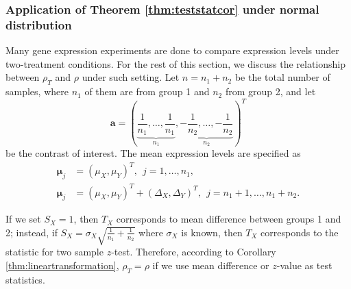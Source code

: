 	\subsubsection{Application of Theorem \ref{thm:teststatcor} under normal distribution}
	
	Many gene expression experiments are done to compare expression levels under two-treatment 
	conditions. For the rest of this section, we discuss the relationship between $\rho_T$ and 
	$\rho$ under such setting.
	Let $n = n_1 + n_2$ be the total number of samples, where $n_1$ of them are from group 1 and 
	$n_2$ from group 2, and let
	\begin{equation}\label{eq:contrast}
	\bm a  = (\underbrace{\frac{1}{n_1}, \ldots, \frac{1}{n_1}}_{n_1}, \underbrace{-\frac{1}{n_2}, 
	\ldots, -\frac{1}{n_2}}_{n_2})^T
	\end{equation}
	be the contrast of interest. 
	The mean expression levels are specified as 
	\begin{equation}\label{eq:meanTwogroup}
	\begin{aligned}
	\bm \mu_j &= (\mu_X, \mu_Y)^T,~~ j = 1, \ldots, n_1, \\
	\bm \mu_j &= (\mu_X,  \mu_Y)^T  + ( \Delta_X,\Delta_Y)^T, ~~j = n_1 + 1, \ldots, n_1 + n_2.
	\end{aligned}
	\end{equation}
	
	
	If we set $S_X=1$, then $T_X$ corresponds to mean difference between groups 1 and 2; instead, 
	if $S_X = \sigma_X\sqrt{\frac{1}{n_1} + \frac{1}{n_2}}$ where $\sigma_X$ is known, then $T_X$ 
	corresponds to the statistic for two sample $z$-test. Therefore, according to Corollary 
	\ref{thm:lineartransformation},  $\rho_T=\rho$ if we use mean difference or $z$-value as test 
	statistics.
	
